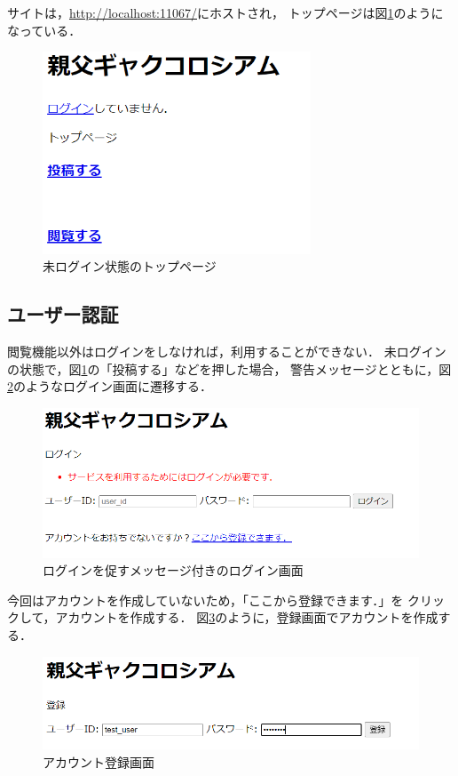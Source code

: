 \documentclass[a4paper,11pt]{jsreport}
\begin{document}
サイトは，\url{http://localhost:11067/}にホストされ，
トップページは図\ref{fig:top_unauth}のようになっている．

\begin{figure}[tb]
  \centering
  \includegraphics[width=8cm]{img/top_unauth.png}
  \caption{未ログイン状態のトップページ\label{fig:top_unauth}}
\end{figure}

\subsection{ユーザー認証}
閲覧機能以外はログインをしなければ，利用することができない．
未ログインの状態で，図\ref{fig:top_unauth}の「投稿する」などを押した場合，
警告メッセージとともに，図\ref{fig:login_post}のようなログイン画面に遷移する．
\begin{figure}[tb]
  \centering
  \includegraphics*[width=13cm]{img/login_post.png}
  \caption{ログインを促すメッセージ付きのログイン画面 \label{fig:login_post}}
\end{figure}

今回はアカウントを作成していないため，「ここから登録できます．」を
クリックして，アカウントを作成する．
図\ref{fig:register}のように，登録画面でアカウントを作成する．
\begin{figure}[tb]
  \centering
  \includegraphics*[width=13cm]{img/register.png}
  \caption{アカウント登録画面\label{fig:register}}
\end{figure}
\end{document}
